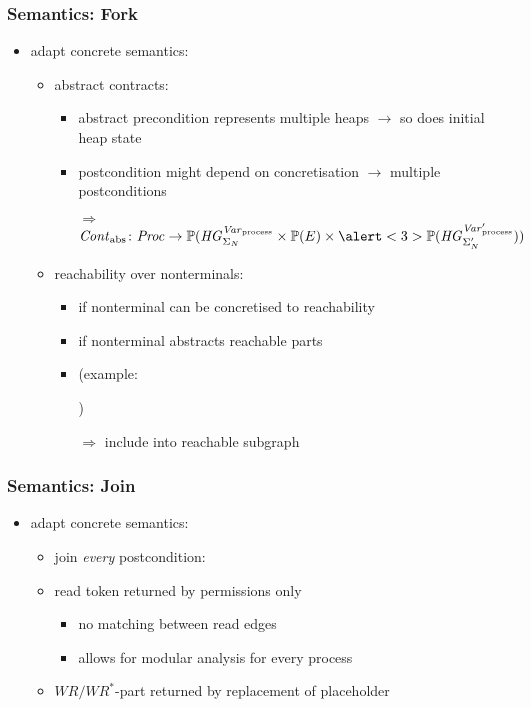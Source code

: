 \documentclass{beamer}
\begin{document}
\begin{frame}
	\frametitle{Semantics: Fork}
	\begin{itemize}
		\item adapt concrete semantics:
			\begin{itemize}
				\item \alert<2-3>{abstract contracts:}
					\begin{itemize}
						\item abstract precondition represents multiple heaps
							$\rightarrow$ so does initial heap state
						\item postcondition might depend on concretisation
							$\rightarrow$ multiple postconditions
						\item[$\Rightarrow$] $ \Cont_{\text{abs}}\colon\Proc
							\rightarrow \mathbb{P}(\HGN\times\mathbb{P}(E)\times
							\alert<3>{\mathbb{P}(\mathit{HG}^{\PI'}_{\Sigma_{N}'})})$
					\end{itemize}
				\item \alert<4-5>{reachability over nonterminals:}
					\begin{itemize}
						\item if nonterminal can be concretised to reachability
						\item if nonterminal abstracts reachable parts
						\item<5> (example: \parbox{4cm}{\resizebox{4cm}{!}{}})
						\item[$\Rightarrow$] include into reachable subgraph
					\end{itemize}
			\end{itemize}
	\end{itemize}
\end{frame}

\begin{frame}
	\frametitle{Semantics: Join}
	\begin{itemize}
		\item adapt concrete semantics:
			\begin{itemize}
				\item join \emph{every} postcondition:
				\item read token returned by permissions only
					\begin{itemize}
						\item no matching between read edges
						\item allows for modular analysis for every process
					\end{itemize}
				\item $\mathit{WR}/\mathit{WR}^{\ast}$-part returned by replacement
					of placeholder
			\end{itemize}
	\end{itemize}
\end{frame}
\end{document}
